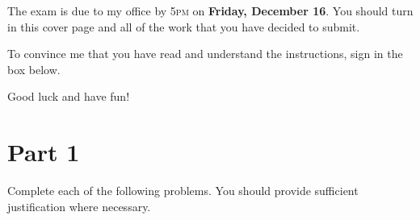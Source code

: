 \documentclass[11pt]{article}
\theoremstyle{definition}
\begin{document}
The exam is due to my office by 5\textsc{pm} on \textbf{Friday, December 16}.  You should turn in this cover page and all of the work that you have decided to submit.

\bigskip

To convince me that you have read and understand the instructions, sign in the box below.

\bigskip


\bigskip

Good luck and have fun!

\newpage

\section*{Part 1}

Complete each of the following problems.  You should provide sufficient justification where necessary.
\end{document}
